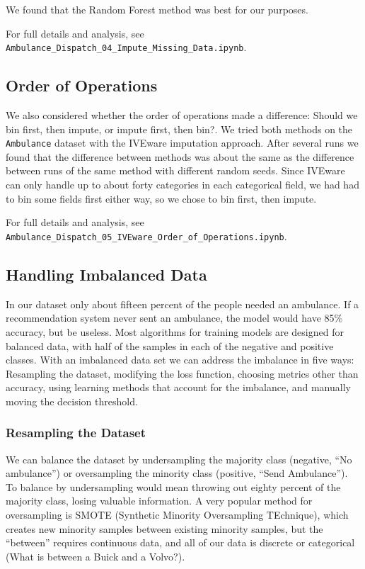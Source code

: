 We found that the Random Forest method was best for our purposes.

For full details and analysis, see 
\verb|Ambulance_Dispatch_04_Impute_Missing_Data.ipynb|.

\subsection{Order of Operations}

We also considered whether the order of operations made a difference:  Should we bin first, then impute, or impute first, then bin?.  We tried both methods on the {\tt Ambulance} dataset with the IVEware imputation approach.  After several runs we found that the difference between methods was about the same as the difference between runs of the same method with different random seeds.  Since IVEware can only handle up to about forty categories in each categorical field, we had had to bin some fields first either way, so we chose to bin first, then impute.  

For full details and analysis, see 
\verb|Ambulance_Dispatch_05_IVEware_Order_of_Operations.ipynb|.

\subsection{Handling Imbalanced Data}

In our dataset only about fifteen percent of the people needed an ambulance.   If a recommendation system never sent an ambulance, the model would have 85\% accuracy, but be useless.  Most algorithms for training models are designed for balanced data, with half of the samples in each of the negative and positive classes.  With an imbalanced data set we can address the imbalance in five ways:  Resampling the dataset, modifying the loss function, choosing metrics other than accuracy, using learning methods that account for the imbalance, and manually moving the decision threshold.

\subsubsection{Resampling the Dataset}

We can balance the dataset by undersampling the majority class (negative, ``No ambulance'') or oversampling the minority class (positive, ``Send Ambulance'').  To balance by undersampling would mean throwing out eighty percent of the majority class, losing valuable information.  A very popular method for oversampling is SMOTE (Synthetic Minority Oversampling TEchnique), which creates new minority samples between existing minority samples, but the ``between'' requires continuous data, and all of our data is discrete or categorical (What is between a Buick and a Volvo?).

